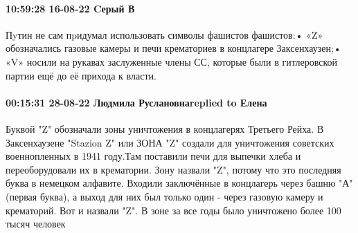  
 
 
 
 

\paragraph{10:59:28 16-08-22 Cерый В}

Пyтин не сам пpидумал использовать символы фашистов фашистов:• «Z» обозначались
газовые камеры и печи крематориев в концлагере Заксенхаузен;• «V» носили на
рукавах заслуженные члены СС, которые были в гитлеровской партии ещё до её
прихода к власти.

\paragraph{00:15:31 28-08-22 Людмила Руслановнаreplied to Елена}

Буквой "Z" обозначали зоны уничтожения в концлагерях Третьего Рейха. В
Заксенхаузене "Stazion Z" или ЗОНА "Z" создали для уничтожения советских
военнопленных в 1941 году.Там поставили печи для выпечки хлеба и
переоборудовали их в крематории. Зону назвали "Z", потому что это последняя
буква в немецком алфавите. Входили заключённые в концлагерь через башню "А"
(первая буква), а выход для них был только один - через газовую камеру и
крематорий. Вот и назвали "Z". В зоне за все годы было уничтожено более 100
тысяч человек
